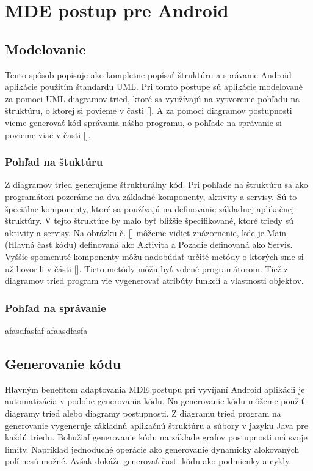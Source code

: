 \documentclass[10pt,twoside,slovak,a4paper]{article}
\begin{document}
\section{MDE postup pre Android} \label{MDE spôsob pre Android}

\subsection{Modelovanie}\label{MDE spôsob pre Android:Modelovanie}
Tento spôsob popisuje ako kompletne popísať štruktúru a správanie Android aplikácie použitím štandardu UML. \newline
Pri tomto postupe sú aplikácie modelované za pomoci UML diagramov tried, ktoré sa využívajú na vytvorenie pohľadu na štruktúru, o ktorej si povieme v časti []. A za pomoci diagramov postupnosti vieme generovať kód správania nášho programu, o pohľade na správanie si povieme viac v časti []. 

\subsubsection{Pohľad na štuktúru}\label{MDE spôsob pre Android:Modelovanie:Pohľad na štuktúru}
Z diagramov tried generujeme štrukturálny kód. Pri pohľade na štruktúru sa ako programátori pozeráme na dva základné komponenty,  aktivity a servisy. Sú to špeciálne komponenty, ktoré sa používajú na definovanie základnej aplikačnej štruktúry. V tejto štruktúre by malo byť bližšie špecifikované, ktoré triedy sú aktivity a servisy. Na obrázku č. [] môžeme vidieť znázornenie, kde je Main (Hlavná časť kódu) definovaná ako Aktivita a Pozadie definovaná ako Servis. \newline
Vyššie spomenuté komponenty môžu nadobúdať určité metódy o ktorých sme si už hovorili v části []. Tieto metódy môžu byť volené programátorom.\newline
Tiež z diagramov tried program vie vygenerovať atribúty funkcií a vlastnosti objektov.


\subsubsection{Pohľad na správanie}\label{MDE spôsob pre Android:Modelovanie:Pohľad na správanie}
afasdfasfaf
afaasdfasfa


\subsection{Generovanie kódu}\label{Generovanie kódu}
Hlavným benefitom adaptovania MDE postupu pri vyvíjaní Android aplikácii je automatizácia v podobe generovania kódu. Na generovanie kódu môžeme použiť diagramy tried alebo diagramy postupnosti.\newline
Z diagramu tried program na generovanie vygeneruje základnú aplikačnú štruktúru a súbory v jazyku Java pre každú triedu.\newline
Bohužiaľ generovanie kódu na základe grafov postupnosti má svoje limity. Napríklad jednoduché operácie ako generovanie dynamicky alokovaných polí nesú možné. Avšak dokáže generovať časti kódu ako podmienky a cykly.
\end{document}
